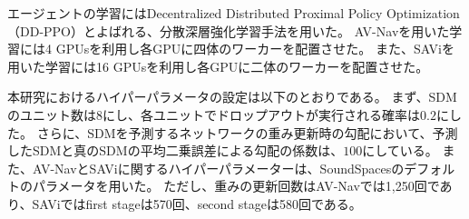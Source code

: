 エージェントの学習にはDecentralized Distributed Proximal Policy Optimization（DD-PPO）\cite{wijmans2019dd}とよばれる、分散深層強化学習手法を用いた。
AV-Navを用いた学習には4 GPUsを利用し各GPUに四体のワーカーを配置させた。
また、SAViを用いた学習には16 GPUsを利用し各GPUに二体のワーカーを配置させた。

本研究におけるハイパーパラメータの設定は以下のとおりである。
まず、SDMのユニット数は$8$にし、各ユニットでドロップアウトが実行される確率は$0.2$にした。
さらに、SDMを予測するネットワークの重み更新時の勾配において、予測したSDMと真のSDMの平均二乗誤差による勾配の係数は、$100$にしている。
また、AV-NavとSAViに関するハイパーパラメーターは、SoundSpacesのデフォルトのパラメータを用いた。
ただし、重みの更新回数はAV-Navでは1,250回であり、SAViではfirst stageは570回、second stageは580回である。



